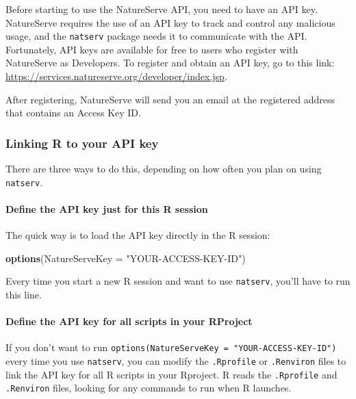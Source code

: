 \documentclass[]{article}
\newenvironment{Shaded}{\begin{snugshade}}{\end{snugshade}}
\newcommand{\DataTypeTok}[1]{\textcolor[rgb]{0.13,0.29,0.53}{#1}}
\newcommand{\KeywordTok}[1]{\textcolor[rgb]{0.13,0.29,0.53}{\textbf{#1}}}
\newcommand{\NormalTok}[1]{#1}
\newcommand{\StringTok}[1]{\textcolor[rgb]{0.31,0.60,0.02}{#1}}
\let\oldparagraph\paragraph
\renewcommand{\paragraph}[1]{\oldparagraph{#1}\mbox{}}
\begin{document}
Before starting to use the NatureServe API, you need to have an API key.
NatureServe requires the use of an API key to track and control any
malicious usage, and the \texttt{natserv} package needs it to
communicate with the API. Fortunately, API keys are available for free
to users who register with NatureServe as Developers. To register and
obtain an API key, go to this link:
\url{https://services.natureserve.org/developer/index.jsp}.

After registering, NatureServe will send you an email at the registered
address that contains an Access Key ID.

\hypertarget{linking-r-to-your-api-key}{%
\subsubsection{Linking R to your API
key}\label{linking-r-to-your-api-key}}

There are three ways to do this, depending on how often you plan on
using \texttt{natserv}.

\hypertarget{define-the-api-key-just-for-this-r-session}{%
\paragraph{Define the API key just for this R
session}\label{define-the-api-key-just-for-this-r-session}}

The quick way is to load the API key directly in the R session:

\begin{Shaded}
\begin{Highlighting}[]
\KeywordTok{options}\NormalTok{(}\DataTypeTok{NatureServeKey =} \StringTok{"YOUR-ACCESS-KEY-ID"}\NormalTok{)}
\end{Highlighting}
\end{Shaded}

Every time you start a new R session and want to use \texttt{natserv},
you'll have to run this line.

\hypertarget{define-the-api-key-for-all-scripts-in-your-rproject}{%
\paragraph{Define the API key for all scripts in your
RProject}\label{define-the-api-key-for-all-scripts-in-your-rproject}}

If you don't want to run
\texttt{options(NatureServeKey\ =\ "YOUR-ACCESS-KEY-ID")} every time you
use \texttt{natserv}, you can modify the \texttt{.Rprofile} or
\texttt{.Renviron} files to link the API key for all R scripts in your
Rproject. R reads the \texttt{.Rprofile} and \texttt{.Renviron} files,
looking for any commands to run when R launches.
\end{document}
